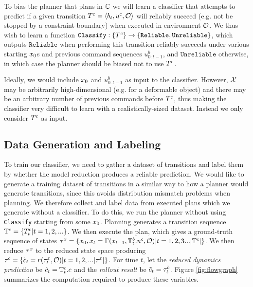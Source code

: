  To bias the planner that plans in $\mathbb{C}$ we will learn a classifier that attempts to predict if a given transition $T^c = \left<b_t,u^c,\mathcal{O}\right>$ will reliably succeed (e.g. not be stopped by a constraint boundary) when executed in environment $\mathcal{O}$. We thus wish to learn a function 
$\texttt{Classify}:\{T^c\} \rightarrow \left\{\texttt{Reliable},\texttt{Unreliable}\right\}$, which outputs $\texttt{Reliable}$ when performing this transition reliably succeeds under various starting $x_0$s and previous command sequences $u^b_{0:t-1}$, and $\texttt{Unreliable}$ otherwise, in which case the planner should be biased not to use $T^c$.

Ideally, we would include $x_0$ and $u^b_{0:t-1}$ as input to the classifier. However, $\mathcal{X}$ may be arbitrarily high-dimensional (e.g. for a deformable object) and there may be an arbitrary number of previous commands before $T^c$, thus making the classifier very difficult to learn with a realistically-sized dataset. Instead we only consider $T^c$ as input.


\subsection{Data Generation and Labeling}


To train our classifier, we need to gather a dataset of transitions and label them by whether the model reduction produces a reliable prediction. We would like to generate a training dataset of transitions in a similar way to how a planner would generate transitions, since this avoids distribution mismatch problems when planning. We therefore collect and label data from executed plans which we generate without a classifier. To do this, we run the planner without using \texttt{Classify} starting from some $x_0$. Planning generates a transition sequence $\mathbb{T}^c = \{T_t^c | t=1,2,...\}$. We then execute the plan, which gives a ground-truth sequence of states $\tau^x = \{x_0, x_t = \Gamma(x_{t-1},\mathbb{T}^b_t.u^c,\mathcal{O}) | t=1,2,3...|\mathbb{T}^c|\}$. We then reduce $\tau^x$ to the reduced state space producing $\tau^c = \{\tilde{c}_t=r(\tau^x_t,\mathcal{O})|t=1,2,...|\tau^x|\}$. For time $t$, let the \textit{reduced dynamics prediction} be $\hat{c}_t = \mathbb{T}^c_t.c$ and the \textit{rollout result} be $\tilde{c}_t = \tau^b_t$. Figure \ref{fig:flowgraph} summarizes the computation required to produce these variables.


